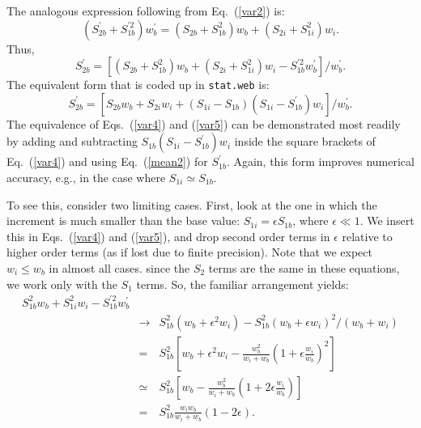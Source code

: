 \documentclass[12pt]{report}
\begin{document}
The analogous expression following from Eq.~(\ref{var2}) is:
\begin{equation}
(S_{2b}^{\prime} + S_{1b}^{\prime 2} ) w_{b}^{\prime}
= (S_{2b} + S_{1b}^{2}) w_{b} 
+ (S_{2i} + S_{1i}^{2}) w_{i}.
\label{var3}
\end{equation}
Thus,
\begin{equation}
S_{2b}^{\prime} = [(S_{2b} + S_{1b}^{2}) w_{b} 
+ (S_{2i} + S_{1i}^{2}) w_{i} - S_{1b}^{\prime 2} w_{b}^{\prime} ] / w_{b}^{\prime}.
\label{var4}
\end{equation}
The equivalent form that is coded up in {\tt stat.web} is:
\begin{equation}
S_{2b}^{\prime} = [S_{2b} w_{b} + S_{2i} w_{i} 
+ (S_{1i} - S_{1b})(S_{1i} - S_{1b}^{\prime}) w_{i} ] / w_{b}^{\prime}.
\label{var5}
\end{equation}
The equivalence of Eqs.~(\ref{var4}) and (\ref{var5}) can be
demonstrated most readily by adding and subtracting 
$S_{1b}(S_{1i} - S_{1b}^{\prime}) w_{i}$ inside the square brackets of
Eq.~(\ref{var4}) and using Eq.~(\ref{mean2}) for $S_{1b}^{\prime}$.  
Again,
this form improves numerical accuracy, e.g., in the case
where $S_{1i} \simeq S_{1b}$.

To see this, consider two limiting cases.  First, look at the
one in which the increment is
much smaller than the base value:  $S_{1i} = \epsilon S_{1b}$, where
$\epsilon \ll 1$.  We insert this in Eqs.~(\ref{var4}) and
(\ref{var5}), and drop second order terms in $\epsilon$ relative to 
higher order terms (as if lost due to finite precision).  Note that
we expect $w_{i} \leq w_{b}$ in almost all cases.   
since the $S_{2}$ terms are the
same in these equations, we work only with the $S_{1}$ terms.  
So, the familiar arrangement yields:
\begin{eqnarray}
S_{1b}^{2} w_{b} + S_{1i}^{2} w_{i} - S_{1b}^{\prime 2} w_{b}^{\prime} & \quad & \\
&\rightarrow& S_{1b}^{2}(w_{b} + \epsilon^{2} w_{i}) 
- S_{1b}^{2}(w_{b} + \epsilon w_{i})^{2}/(w_{b}+w_{i}) \\
&=&  S_{1b}^{2} [ w_{b} + \epsilon^{2} w_{i} - \frac{w_{b}^{2}}{w_{i}+w_{b}}(1 
+ \epsilon \frac{w_{i}}{w_{b}})^{2}] \\
&\simeq& S_{1b}^{2} [w_{b} - \frac{w_{b}^{2}}{w_{i}+w_{b}} (1 
+ 2 \epsilon \frac{w_{i}}{w_{b}} )] \\
&=& S_{1b}^{2} \frac{w_{i} w_{b}}{w_{i} + w_{b}} (1 - 2 \epsilon).
\label{comp1t}
\end{eqnarray}
\end{document}
